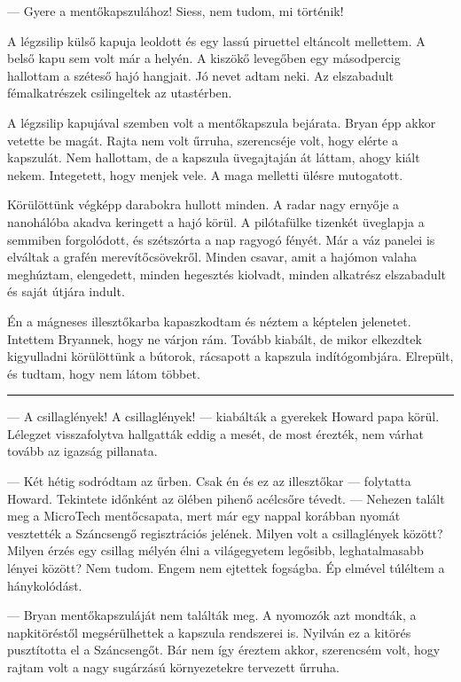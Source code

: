 \documentclass[10pt]{memoir}
\renewcommand{\pfbreakdisplay}{\bigskip \ding{70} \bigskip}
\newcommand{\secbreak}{\fancybreak{\pfbreakdisplay}}
\begin{document}
--- Gyere a mentőkapszulához! Siess, nem tudom, mi történik!

A légzsilip külső kapuja leoldott és egy lassú piruettel eltáncolt mellettem. A
belső kapu sem volt már a helyén. A kiszökő levegőben egy másodpercig hallottam
a széteső hajó hangjait. Jó nevet adtam neki. Az elszabadult fémalkatrészek
csilingeltek az utastérben.

A légzsilip kapujával szemben volt a mentőkapszula bejárata. Bryan épp akkor
vetette be magát. Rajta nem volt űrruha, szerencséje volt, hogy elérte a
kapszulát. Nem hallottam, de a kapszula üvegajtaján át láttam, ahogy kiált
nekem. Integetett, hogy menjek vele. A maga melletti ülésre mutogatott.

Körülöttünk végképp darabokra hullott minden. A radar nagy ernyője a nanohálóba
akadva keringett a hajó körül. A pilótafülke tizenkét üveglapja a semmiben
forgolódott, és szétszórta a nap ragyogó fényét. Már a váz panelei is elváltak
a grafén merevítőcsövekről. Minden csavar, amit a hajómon valaha meghúztam,
elengedett, minden hegesztés kiolvadt, minden alkatrész elszabadult és saját
útjára indult.

Én a mágneses illesztőkarba kapaszkodtam és néztem a képtelen jelenetet.
Intettem Bryannek, hogy ne várjon rám. Tovább kiabált, de mikor elkezdtek
kigyulladni körülöttünk a bútorok, rácsapott a kapszula indítógombjára.
Elrepült, és tudtam, hogy nem látom többet.

\secbreak \itshape

--- A csillaglények! A csillaglények! --- kiabálták a gyerekek Howard papa
körül.  Lélegzet visszafolytva hallgatták eddig a mesét, de most érezték, nem
várhat tovább az igazság pillanata.

--- Két hétig sodródtam az űrben. Csak én és ez az illesztőkar --- folytatta
Howard. Tekintete időnként az ölében pihenő acélcsőre tévedt. --- Nehezen
talált meg a MicroTech mentőcsapata, mert már egy nappal korábban nyomát
vesztették a Száncsengő regisztrációs jelének. Milyen volt a csillaglények
között? Milyen érzés egy csillag mélyén élni a világegyetem legősibb,
leghatalmasabb lényei között? Nem tudom. Engem nem ejtettek fogságba. Ép
elmével túléltem a hánykolódást.

--- Bryan mentőkapszuláját nem találták meg. A nyomozók azt mondták, a
napkitöréstől megsérülhettek a kapszula rendszerei is. Nyilván ez a kitörés
pusztította el a Száncsengőt. Bár nem így éreztem akkor, szerencsém volt, hogy
rajtam volt a nagy sugárzású környezetekre tervezett űrruha.
\end{document}
